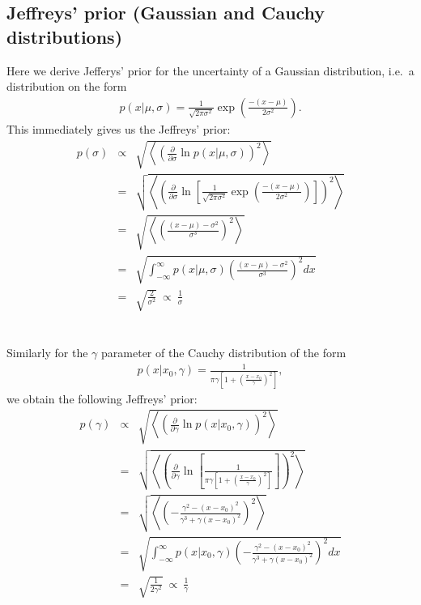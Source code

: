 \subsection{Jeffreys' prior (Gaussian and Cauchy distributions)}
Here we derive Jefferys' prior for the uncertainty of a Gaussian distribution, i.e.~a distribution on the form
\begin{eqnarray}
    p(x|\mu, \sigma) = \frac{1}{\sqrt{2\pi\sigma^2}} \exp \left( \frac{-(x-\mu)}{2\sigma^2} \right).
\end{eqnarray}
This immediately gives us the Jeffreys' prior:
\begin{eqnarray}
    p(\sigma)
    & \propto & \sqrt{\left\langle \left( \frac{\partial}{\partial\sigma}
        \ln p(x|\mu, \sigma) \right)^2 \right\rangle}\nonumber\\
    & = & \sqrt{\left\langle \left( \frac{\partial}{\partial\sigma}
        \ln \left[\frac{1}{\sqrt{2\pi\sigma^2}} \exp \left( \frac{-(x-\mu)}{2\sigma^2} \right) \right]
        \right)^2 \right\rangle}\nonumber\\
    & = & \sqrt{\left\langle \left(\frac{(x-\mu) - \sigma^2}{\sigma^3} \right)^2 \right\rangle}\nonumber\\
    & = & \sqrt{\int^{\infty}_{-\infty}  p(x|\mu, \sigma) \left(\frac{(x-\mu) - \sigma^2}{\sigma^3} \right)^2 dx}\nonumber\\
    & = &\sqrt{ \frac{2}{\sigma^2}} \ \propto \ \frac{1}{\sigma}
\end{eqnarray}
\\\\Similarly for the $\gamma$ parameter of the Cauchy distribution of the form
\begin{eqnarray}
    p(x|x_0, \gamma) = \frac{1}{\pi\gamma\left[ 1 + \left(\frac{x-x_0}{\gamma} \right)^2\right]},
\end{eqnarray}
we obtain the following Jeffreys' prior:
\begin{eqnarray}
p(\gamma)
& \propto & \sqrt{\left\langle \left( \frac{\partial}{\partial\gamma}
    \ln p(x|x_0, \gamma) \right)^2 \right\rangle}\nonumber\\
& = & \sqrt{\left\langle \left( \frac{\partial}{\partial\gamma}
\ln \left[\frac{1}{\pi\gamma\left[ 1 + \left(\frac{x-x_0}{\gamma} \right)^2\right]} \right] \right)^2 \right\rangle}\nonumber\\
& = & \sqrt{\left\langle \left( -\frac{\gamma^2 - (x-x_0)^2}{\gamma^3 +\gamma(x-x_0)^2} \right)^2 \right\rangle }\nonumber\\
& = & \sqrt{\int^{\infty}_{-\infty}  p(x|x_0, \gamma) \left(  -\frac{\gamma^2 - (x-x_0)^2}{\gamma^3 +\gamma(x-x_0)^2}\right)^2 dx }\nonumber\\
& = & \sqrt{\frac{1}{2\gamma^2}} \ \propto \ \frac{1}{\gamma}
\end{eqnarray}

